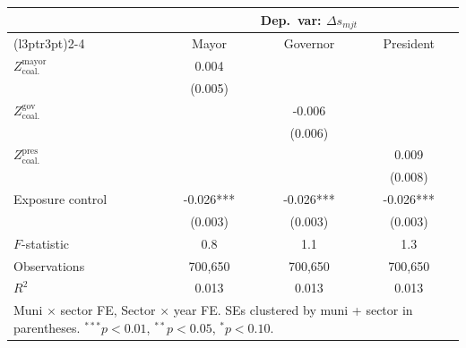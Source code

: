 \begin{tabular}[t]{lccc}
\toprule
\multicolumn{1}{c}{\textbf{ }} & \multicolumn{3}{c}{\textbf{Dep.~var: $\Delta s_{mjt}$}} \\
\cmidrule(l{3pt}r{3pt}){2-4}
  & Mayor & Governor & President\\
\midrule
$Z^{\text{mayor}}_{\text{coal.}}$ & 0.004 &  & \\
 & (0.005) &  & \\
$Z^{\text{gov}}_{\text{coal.}}$ &  & -0.006 & \\
 &  & (0.006) & \\
$Z^{\text{pres}}_{\text{coal.}}$ &  &  & 0.009\\
 &  &  & (0.008)\\
Exposure control & -0.026*** & -0.026*** & -0.026***\\
 & (0.003) & (0.003) & (0.003)\\
\midrule
$F$-statistic & 0.8 & 1.1 & 1.3\\
Observations & 700,650 & 700,650 & 700,650\\
$R^2$ & 0.013 & 0.013 & 0.013\\
\bottomrule
\multicolumn{4}{l}{\rule{0pt}{1em}Muni $\times$ sector FE, Sector $\times$ year FE. SEs clustered by muni + sector in parentheses. $^{***}p<0.01$, $^{**}p<0.05$, $^{*}p<0.10$.}\\
\end{tabular}
